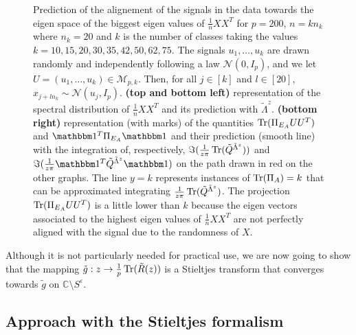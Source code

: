 \documentclass[a4papaer, titlepage]{book}
\begin{document}
\begin{figure}
\caption{Prediction of the alignement of the signals in the data towards the eigen space of the biggest eigen values of $\frac1n XX^T$ for $p = 200$, $n = k n_k$ where $n_k = 20$ and $k$ is the number of classes taking the values $k = 10, 15, 20, 30, 35, 42, 50, 62, 75$. The signals $u_1,\ldots, u_k$ are drawn randomly and independently following a law $\mathcal N ( 0,I_p)$, and we let $U = (u_1,\ldots, u_k) \in \mathcal M_{p,k}$. Then, for all $j \in [k]$ and $l \in [20]$, $x_{j + ln_k} \sim \mathcal N(u_{j}, I_p)$. \textbf{(top and bottom left)} representation of the spectral distribution of $\frac1n XX^T$ and its prediction with $\tilde \Lambda^z$.%
\textbf{(bottom right)} representation (with marks) of the quantities $\operatorname{Tr}(\Pi_{E_A} UU^T)$ and $\un^T \Pi_{E_A} \un$ and their prediction (smooth line) with the integration of, respectively, $\Im(\frac1{z\pi}\operatorname{Tr}(\tilde Q^{\tilde \Lambda^z}))$ and $\Im(\frac1{z\pi}\un^T\tilde Q^{\tilde \Lambda^z}\un)$ on the path drawn in red on the other graphs. The line $y=k$ represents instances of $\operatorname{Tr}(\Pi_A) = k$ that can be approximated integrating $\frac1{z\pi}\operatorname{Tr}( \tilde Q^{\tilde \Lambda^z})$. The projection $\operatorname{Tr}(\Pi_{E_A} UU^T)$ is a little lower than $k$ because the eigen vectors associated to the highest eigen values of $\frac1n XX^T$ are not perfectly aligned with the signal due to the randomness of $X$.}%
\label{fig:spectre_XXT_influence_nombre_de_classe}
\end{figure}


Although it is not particularly needed for practical use, we are now going to show that the mapping $\tilde g : z \to \frac{1}{p} \operatorname{Tr}(\tilde R(z))$ is a Stieltjes transform that converges towards $\tilde g$ on $\mathbb C \setminus S^\varepsilon$.


\subsection{Approach with the Stieltjes formalism}\label{sse:stieltjes_approach}
\end{document}
